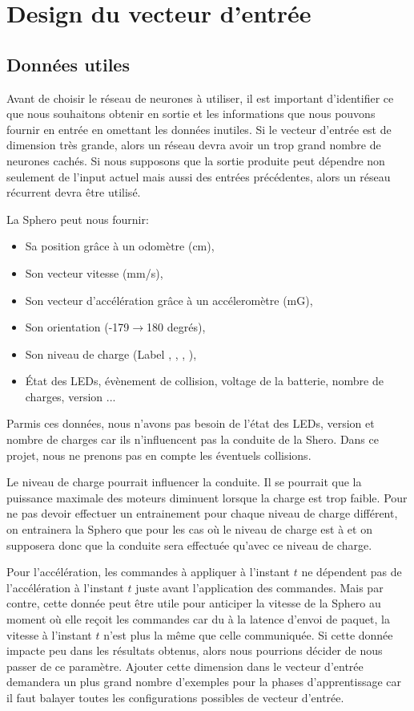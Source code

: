 \section{Design du vecteur d'entrée}
\subsection{Données utiles}
Avant de choisir le réseau de neurones à utiliser, il est important d'identifier ce que nous souhaitons obtenir en sortie et les informations que nous pouvons fournir en entrée en omettant les données inutiles.
Si le vecteur d'entrée est de dimension très grande, alors un réseau \rbf devra avoir un trop grand nombre de neurones cachés\cite{Gauthier}.
Si nous supposons que la sortie produite peut dépendre non seulement de l'input actuel mais aussi des entrées précédentes, alors un réseau récurrent devra être utilisé.

La Sphero peut nous fournir:\cite{SDKofficiels}
\begin{itemize}
 \item Sa position grâce à un odomètre (cm),
 \item Son vecteur vitesse (mm/s),
 \item Son vecteur d'accélération grâce à un accéleromètre (mG),
 \item Son orientation (-179$\rightarrow$180 degrés),
 \item Son niveau de charge (Label , , , ),
 \item État des LEDs, évènement de collision, voltage de la batterie, nombre de charges, version ...
\end{itemize}

Parmis ces données, nous n'avons pas besoin de l'état des LEDs, version et nombre de charges car ils n'influencent pas la conduite de la Shero.
Dans ce projet, nous ne prenons pas en compte les éventuels collisions.

Le niveau de charge pourrait influencer la conduite.
Il se pourrait que la puissance maximale des moteurs diminuent lorsque la charge est trop faible.
Pour ne pas devoir effectuer un entrainement pour chaque niveau de charge différent, on entrainera la Sphero que pour les cas où le niveau de charge est à  et on supposera donc que la conduite sera effectuée qu'avec ce niveau de charge.

Pour l'accélération, les commandes à appliquer à l'instant $t$ ne dépendent pas de l'accélération à l'instant $t$ juste avant l'application des commandes.
Mais par contre, cette donnée peut être utile pour anticiper la vitesse de la Sphero au moment où elle reçoit les commandes car du à la latence d'envoi de paquet, la vitesse à l'instant $t$ n'est plus la même que celle communiquée.
Si cette donnée impacte peu dans les résultats obtenus, alors nous pourrions décider de nous passer de ce paramètre.
Ajouter cette dimension dans le vecteur d'entrée demandera un plus grand nombre d'exemples pour la phases d'apprentissage car il faut balayer toutes les configurations possibles de vecteur d'entrée.

